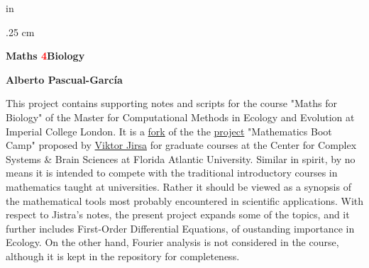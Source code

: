 \documentclass[11pt]{article}
\begin{document}
\def\thcr{\cr\noalign{\vskip.3cm}}

\newlength{\eqbreite}\setlength{\eqbreite}{\textwidth}

\addtolength{\eqbreite}{-1.5cm}



\long\def\bnn#1\enn{$$\begin{minipage}{\eqbreite}

\vskip .1cm \let\\ = \thcr \halign{$\displaystyle{##}$

\hfil && $\displaystyle{##}$\hfil \cr#1 \cr}

\vskip.3cm \end{minipage}$$}



 in

\parskip .25 cm












\thispagestyle{empty}

\svs

\begin{center}

\begin{huge}
  \textrm{\textbf{Maths	{\textcolor{red}{\Huge 4}}Biology}}\\
\end{huge} 
\vspace*{1cm}
\begin{Large}
  {\bf Alberto Pascual-Garc{\'i}a} \\
\end{Large}

\end{center} \vs



\normalsize
This project contains supporting notes and scripts for the course "Maths for Biology"
of the Master for Computational Methods in Ecology and Evolution at 
Imperial College London. It is a \href{}{fork} of the the 
\href{https://github.com/vjirsa/bootcamp}{project} "Mathematics Boot Camp" proposed
by \href{http://ins.univ-amu.fr/research-teams/team-member/v.jirsa/}{Viktor Jirsa}
for graduate courses at the Center for Complex Systems \& Brain Sciences at Florida
Atlantic University. Similar in spirit, by no means it is intended to compete with the
traditional introductory courses in mathematics taught at universities. Rather it should
be viewed as a synopsis of the mathematical tools most probably encountered in scientific
applications. With respect to Jistra's notes, the present project expands
some of the topics, and it further includes First-Order Differential Equations, of oustanding importance
in Ecology. On the other hand, Fourier analysis is not considered in the course, although it is kept in the repository for completeness.
\end{document}
